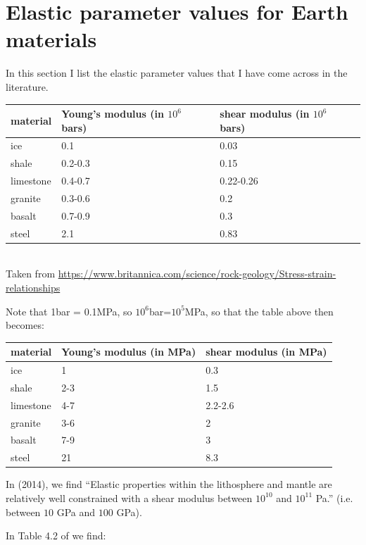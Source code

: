 \newpage
\section{Elastic parameter values for Earth materials}

In this section I list the elastic parameter values that I have come across in the literature.

\begin{center}
\begin{tabular}{lll}
\hline
material & Young's modulus (in $10^6$ bars) &	shear modulus (in $10^6$ bars)  \\
\hline\hline
ice &	0.1 &	0.03\\
shale &	0.2-0.3 	& 0.15\\
limestone &	0.4-0.7 &	0.22-0.26\\
granite &	0.3-0.6 &	0.2\\
basalt &	0.7-0.9 &	0.3\\
steel &	2.1 &	0.83 \\
\hline
\end{tabular}\\
{\captionfont Taken from 
\url{https://www.britannica.com/science/rock-geology/Stress-strain-relationships}}
\end{center}

Note that 1bar = 0.1MPa, so $10^6$bar=$10^5$MPa, so that the table above then 
becomes:

\begin{center}
\begin{tabular}{lll}
\hline
material & Young's modulus (in MPa) &	shear modulus (in MPa)  \\
\hline\hline
ice &	1 &	0.3\\
shale &	2-3 	& 1.5\\
limestone &	4-7 &	2.2-2.6\\
granite &	3-6 &	2\\
basalt &	7-9 &	3\\
steel &	21 &	8.3 \\
\hline
\end{tabular}
\end{center}

In \textcite{famc14} (2014), we find ``Elastic properties within the 
lithosphere and mantle are relatively well constrained with a shear 
modulus between $10^{10}$ and $10^{11}$ Pa.'' (i.e. between $10$ GPa
and $100$ GPa).

In Table 4.2 of \textcite{sadd14} we find:

